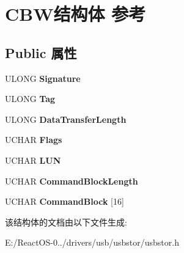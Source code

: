 \hypertarget{struct_c_b_w}{}\section{C\+B\+W结构体 参考}
\label{struct_c_b_w}
\subsection*{Public 属性}
\begin{DoxyCompactItemize}
\item 
\mbox{\label{struct_c_b_w_a61de6f9688095bbd5946d0474ee4d6d9}} 
U\+L\+O\+NG {\bfseries Signature}
\item 
\mbox{\label{struct_c_b_w_a645be495a6abed94584a0c9f84be43ff}} 
U\+L\+O\+NG {\bfseries Tag}
\item 
\mbox{\label{struct_c_b_w_ac3823a8f249803ff5012ab1f1e8ab2d8}} 
U\+L\+O\+NG {\bfseries Data\+Transfer\+Length}
\item 
\mbox{\label{struct_c_b_w_a98309c3c78fa2522df3e795cc3286253}} 
U\+C\+H\+AR {\bfseries Flags}
\item 
\mbox{\label{struct_c_b_w_a3d11d4b4c9e609b4244853ebd86e1aed}} 
U\+C\+H\+AR {\bfseries L\+UN}
\item 
\mbox{\label{struct_c_b_w_a4f09fe7444313ecab3508a9adcff8f73}} 
U\+C\+H\+AR {\bfseries Command\+Block\+Length}
\item 
\mbox{\label{struct_c_b_w_a8b9a5016005878c7d84e86257d5474fb}} 
U\+C\+H\+AR {\bfseries Command\+Block} \mbox{[}16\mbox{]}
\end{DoxyCompactItemize}


该结构体的文档由以下文件生成\+:\begin{DoxyCompactItemize}
\item 
E\+:/\+React\+O\+S-\/0../drivers/usb/usbstor/usbstor.\+h\end{DoxyCompactItemize}
